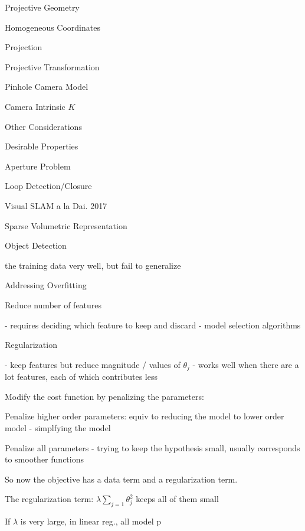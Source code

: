 \begin{section}
\begin{subsubsection}
\begin{subsubsection}
\begin{subsubsection}
\begin{section}{Projective Geometry}
\begin{subsection}{Homogeneous Coordinates}
\begin{subsubsection}
{\begin{subsubsection}{Projection}
\begin{subsubsection}{Projective Transformation}
\begin{subsection}
\begin{subsubsection}
\begin{subsubsection}
\begin{subsubsection}
{\begin{subsubsection}
\begin{subsection}
\begin{subsection} {Pinhole Camera Model}
\begin{subsection} {Camera Intrinsic $K$}
\begin{subsection}
\begin{subsection}
\begin{subsubsection}{Other Considerations}
{\begin{subsection}
\begin{subsubsection}{Desirable Properties}
\begin{section}
\begin{subsection}
\begin{subsection}
\begin{subsection}
\begin{section}
\begin{subsection}
\begin{subsubsection}
\begin{subsubsection}
\begin{subsection}
\begin{section}
\begin{subsection}
\begin{subsubsection}{Aperture Problem}
\begin{subsubsection}
{\begin{section}
\begin{subsubsection}
\begin{subsubsection}
\begin{subsubsection}
\begin{subsection}
\begin{subsection}
\begin{subsection}
\begin{subsection}
\begin{subsection}
\begin{subsection}
\begin{subsection}
\begin{subsubsection}
{\begin{subsubsection}
{\begin{subsubsection}
\begin{section}
\begin{section}
\begin{section}
\begin{subsubsection}
\begin{subsubsection}{Loop Detection/Closure}
\begin{subsubsection}{Visual SLAM a la Dai. 2017}
\begin{subsubsection}{Sparse Volumetric Representation}
\begin{subsection}
\begin{section}{Object Detection}
\begin{subsubsection}
{\begin{subsection}
\begin{subsection}
\begin{section}
\begin{section}
\begin{subsection}
\begin{subsubsection}
\begin{subsubsection}
\begin{subsection}
\begin{subsection}
\begin{subsubsection}
\begin{subsubsection}
\begin{subsubsection}
{\begin{subsection}
\begin{subsection}
\begin{subsection}
\begin{subsection}
\begin{section}
\begin{subsection}
\begin{subsubsection}
\begin{subsubsection}
\begin{subsubsection}
\begin{subsubsection}
\begin{subsubsection}
\begin{subsubsection}
\begin{subsection}
\begin{subsubsection}
\begin{subsection}
\begin{subsection}
\begin{subsubsection}
\begin{subsubsection}
\begin{subsection}
the training data very well, but fail to generalize

\begin{subsubsection}{ Addressing Overfitting

Reduce number of features

- requires deciding which feature to keep and discard
- model selection algorithms

Regularization

- keep features but reduce magnitude / values of $\theta_j$ 
- works well when there are a lot features, each of which contributes less

Modify the cost function by penalizing the parameters:

Penalize higher order parameters: equiv to reducing the model to lower order model - simplfying the model

Penalize all parameters  - trying to keep the hypothesis small, usually corresponds to smoother functions

So now the objective has a data term and a regularization term.

The regularization term: $\lambda\sum_{j=1} \theta_j^2 $ keeps all of them small

If $\lambda $ is very large, in linear reg., all model p}
\end{subsubsection}
\end{subsection}
\end{subsubsection}
\end{subsubsection}
\end{subsection}
\end{subsection}
\end{subsubsection}
\end{subsection}
\end{subsubsection}
\end{subsubsection}
\end{subsubsection}
\end{subsubsection}
\end{subsubsection}
\end{subsubsection}
\end{subsection}
\end{section}
\end{subsection}
\end{subsection}
\end{subsection}
\end{subsection}}
\end{subsubsection}
\end{subsubsection}
\end{subsubsection}
\end{subsection}
\end{subsection}
\end{subsubsection}
\end{subsubsection}
\end{subsection}
\end{section}
\end{section}
\end{subsection}
\end{subsection}}
\end{subsubsection}
\end{section}
\end{subsection}
\end{subsubsection}
\end{subsubsection}
\end{subsubsection}
\end{subsubsection}
\end{section}
\end{section}
\end{section}
\end{subsubsection}}
\end{subsubsection}}
\end{subsubsection}
\end{subsection}
\end{subsection}
\end{subsection}
\end{subsection}
\end{subsection}
\end{subsection}
\end{subsection}
\end{subsubsection}
\end{subsubsection}
\end{subsubsection}
\end{section}}
\end{subsubsection}
\end{subsubsection}
\end{subsection}
\end{section}
\end{subsection}
\end{subsubsection}
\end{subsubsection}
\end{subsection}
\end{section}
\end{subsection}
\end{subsection}
\end{subsection}
\end{section}
\end{subsubsection}
\end{subsection}}
\end{subsubsection}
\end{subsection}
\end{subsection}
\end{subsection}
\end{subsection}
\end{subsection}
\end{subsubsection}}
\end{subsubsection}
\end{subsubsection}
\end{subsubsection}
\end{subsection}
\end{subsubsection}
\end{subsubsection}}
\end{subsubsection}
\end{subsection}
\end{section}
\end{subsubsection}
\end{subsubsection}
\end{subsubsection}
\end{section}
